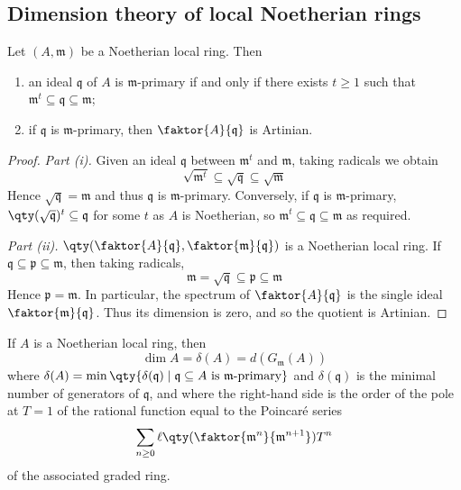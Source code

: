 \subsection{Dimension theory of local Noetherian rings}
\begin{lemma}
    Let \( (A, \mathfrak m) \) be a Noetherian local ring.
    Then
    \begin{enumerate}
        \item an ideal \( \mathfrak q \) of \( A \) is \( \mathfrak m \)-primary if and only if there exists \( t \geq 1 \) such that \( \mathfrak m^t \subseteq \mathfrak q \subseteq \mathfrak m \);
        \item if \( \mathfrak q \) is \( \mathfrak m \)-primary, then \( \faktor{A}{\mathfrak q} \) is Artinian.
    \end{enumerate}
\end{lemma}
\begin{proof}
    \emph{Part (i).}
    Given an ideal \( \mathfrak q \) between \( \mathfrak m^t \) and \( \mathfrak m \), taking radicals we obtain
    \[ \sqrt{\mathfrak m^t} \subseteq \sqrt{\mathfrak q} \subseteq \sqrt{\mathfrak m} \]
    Hence \( \sqrt{\mathfrak q} = \mathfrak m \) and thus \( \mathfrak q \) is \( \mathfrak m \)-primary.
    Conversely, if \( \mathfrak q \) is \( \mathfrak m \)-primary, \( \qty(\sqrt{\mathfrak q})^t \subseteq \mathfrak q \) for some \( t \) as \( A \) is Noetherian, so \( \mathfrak m^t \subseteq \mathfrak q \subseteq \mathfrak m \) as required.

    \emph{Part (ii).}
    \( \qty(\faktor{A}{\mathfrak q}, \faktor{\mathfrak m}{\mathfrak q}) \) is a Noetherian local ring.
    If \( \mathfrak q \subseteq \mathfrak p \subseteq \mathfrak m \), then taking radicals,
    \[ \mathfrak m = \sqrt{\mathfrak q} \subseteq \mathfrak p \subseteq \mathfrak m \]
    Hence \( \mathfrak p = \mathfrak m \).
    In particular, the spectrum of \( \faktor{A}{\mathfrak q} \) is the single ideal \( \faktor{\mathfrak m}{\mathfrak q} \).
    Thus its dimension is zero, and so the quotient is Artinian.
\end{proof}
\begin{theorem}
    If \( A \) is a Noetherian local ring, then
    \[ \dim A = \delta(A) = d(G_{\mathfrak m}(A)) \]
    where \( \delta(A) = \min \qty{\delta(\mathfrak q) \mid \mathfrak q \subseteq A \text{ is } \mathfrak m \text{-primary}} \) and \( \delta(\mathfrak q) \) is the minimal number of generators of \( \mathfrak q \), and where the right-hand side is the order of the pole at \( T = 1 \) of the rational function equal to the Poincar\'e series
    \[ \sum_{n \geq 0} \ell\qty(\faktor{\mathfrak m^n}{\mathfrak m^{n+1}}) T^n \]
    of the associated graded ring.
\end{theorem}

